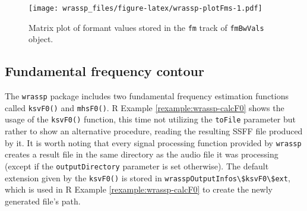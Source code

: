 \documentclass[]{book}
\newenvironment{Shaded}{\begin{snugshade}}{\end{snugshade}}
\newcommand{\CommentTok}[1]{\textcolor[rgb]{0.56,0.35,0.01}{\textit{#1}}}
\newcommand{\DataTypeTok}[1]{\textcolor[rgb]{0.13,0.29,0.53}{#1}}
\newcommand{\DecValTok}[1]{\textcolor[rgb]{0.00,0.00,0.81}{#1}}
\newcommand{\KeywordTok}[1]{\textcolor[rgb]{0.13,0.29,0.53}{\textbf{#1}}}
\newcommand{\NormalTok}[1]{#1}
\newcommand{\OperatorTok}[1]{\textcolor[rgb]{0.81,0.36,0.00}{\textbf{#1}}}
\newcommand{\StringTok}[1]{\textcolor[rgb]{0.31,0.60,0.02}{#1}}
\theoremstyle{definition}
\theoremstyle{definition}
\theoremstyle{definition}
\theoremstyle{remark}
\begin{document}
\begin{Shaded}
\end{Shaded}

\begin{figure}
\centering
\texttt{[image: wrassp\_files/figure-latex/wrassp-plotFms-1.pdf]}
\caption{\label{fig:wrassp-plotFms}Matrix plot of formant values stored in
the \texttt{fm} track of \texttt{fmBwVals} object.}
\end{figure}

\hypertarget{subsec:wrassp_f0}{%
\subsection{Fundamental frequency contour}\label{subsec:wrassp_f0}}

The \texttt{wrassp} package includes two fundamental frequency
estimation functions called \texttt{ksvF0()} and \texttt{mhsF0()}. R
Example \ref{rexample:wrassp-calcF0} shows the usage of the
\texttt{ksvF0()} function, this time not utilizing the \texttt{toFile}
parameter but rather to show an alternative procedure, reading the
resulting SSFF file produced by it. It is worth noting that every signal
processing function provided by \texttt{wrassp} creates a result file in
the same directory as the audio file it was processing (except if the
\texttt{outputDirectory} parameter is set otherwise). The default
extension given by the \texttt{ksvF0()} is stored in
\texttt{wrasspOutputInfos\textbackslash{}\$ksvF0\textbackslash{}\$ext},
which is used in R Example \ref{rexample:wrassp-calcF0} to create the
newly generated file's path.
\end{document}
